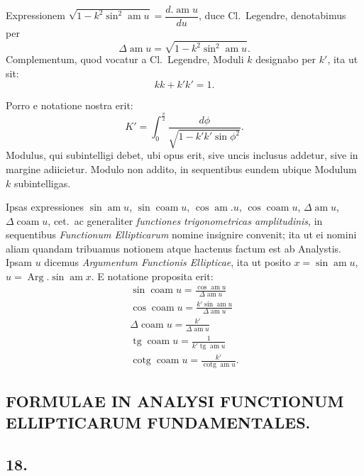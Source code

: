 \documentclass{article}
\begin{document}
Expressionem $\sqrt{1-k^{2}\sin^{2}\operatorname{am}u}=\dfrac{d.\operatorname{am}u}{du}$, duce Cl.\ Legendre, denotabimus per
\[
\Delta\operatorname{am}u=\sqrt{1-k^{2}\sin^{2}\operatorname{am}u}.
\]
Complementum, quod vocatur a Cl.\ Legendre, Moduli $k$ designabo per $k'$, ita ut sit:
\[
kk+k'k'=1.
\]

Porro e notatione nostra erit:
\[
K'=\int_{0}^{\frac{\pi}{2}}\frac{d\phi}{\sqrt{1-k'k'\sin\phi^{2}}}.
\]
Modulus, qui subintelligi debet, ubi opus erit, sive uncis inclusus addetur, sive in margine adiicietur. Modulo non addito, in sequentibus eundem ubique Modulum $k$ subintelligas.

Ipsas expressiones $\sin\operatorname{am}u$, $\sin\operatorname{coam}u$, $\cos\operatorname{am}.u$, $\cos\operatorname{coam}u$, $\Delta\operatorname{am}u$, $\Delta\operatorname{coam}u$, cet.\ ac generaliter \emph{functiones trigonometricas amplitudinis}, in sequentibus \emph{Functionum Ellipticarum} nomine insignire convenit; ita ut ei nomini aliam quandam tribuamus notionem atque hactenus factum est ab Analystis. Ipsam $u$ dicemus \emph{Argumentum Functionis Ellipticae}, ita ut posito $x=\sin\operatorname{am}u$, $u=\operatorname{Arg}.\sin\operatorname{am}x$. E notatione proposita erit:
\[
\begin{gathered}
\sin\operatorname{coam}u=\frac{\cos\operatorname{am}u}{\Delta\operatorname{am}u}\\
\cos\operatorname{coam}u=\frac{k'\sin\operatorname{am}u}{\Delta\operatorname{am}u}\\
\Delta\operatorname{coam}u=\frac{k'}{\Delta\operatorname{am}u}\\
\operatorname{tg}\operatorname{coam}u=\frac{1}{k'\operatorname{tg}\operatorname{am}u}\\
\operatorname{cotg}\operatorname{coam}u=\frac{k'}{\operatorname{cotg}\operatorname{am}u}.
\end{gathered}
\]


\subsection*{FORMULAE IN ANALYSI FUNCTIONUM ELLIPTICARUM FUNDAMENTALES.}

\subsection*{18.}
\end{document}
